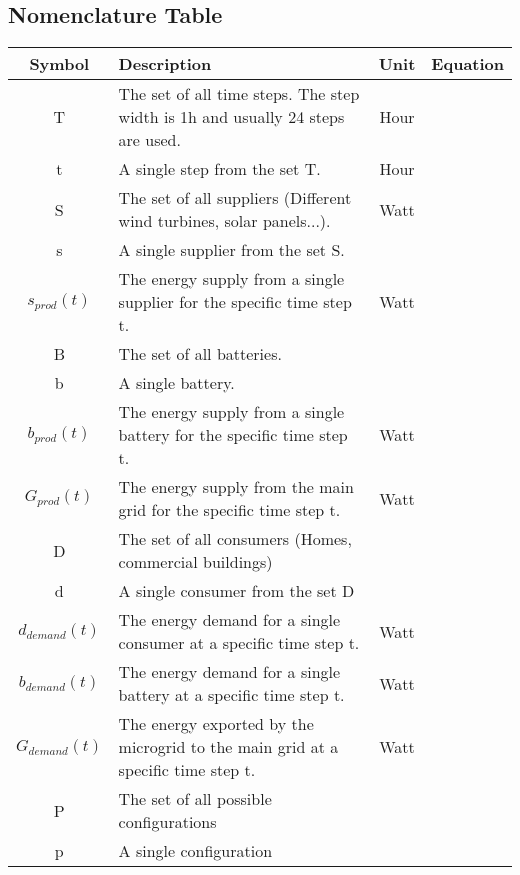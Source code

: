 \subsection{Nomenclature Table}
	\begin{longtable}{|c|p{10cm}|c|c|}
		\toprule
		\textbf{Symbol} & \textbf{Description} & \textbf{Unit} & \textbf{Equation} \\ \midrule
		T & The set of all time steps. The step width is 1h and usually 24 steps are used. & Hour & \Cref{eq1:balance,eq:opt} \\ \midrule
		t & A single step from the set T. & Hour & \Cref{eq1:balance,eq:opt} \\ \midrule
		S & The set of all suppliers (Different wind turbines, solar panels...). & Watt & \Cref{eq1:balance} \\ \midrule
		s & A single supplier from the set S. & & \Cref{eq1:balance} \\ \midrule
		$s_{prod}(t)$ & The energy supply from a single supplier for the specific time step t. & Watt & \Cref{eq1:balance} \\ \midrule
		B & The set of all batteries. & & \Cref{eq1:balance} \\ \midrule
		b & A single battery. & & \Cref{eq1:balance} \\ \midrule
		$b_{prod}(t)$ & The energy supply from a single battery for the specific time step t. & Watt & \Cref{eq1:balance} \\ \midrule
		$G_{prod}(t)$ & The energy supply from the main grid for the specific time step t. & Watt & \Cref{eq1:balance} \\ \midrule
		D & The set of all consumers (Homes, commercial buildings) & & \Cref{eq1:balance} \\ \midrule
		d & A single consumer from the set D & & \Cref{eq1:balance} \\ \midrule
		$d_{demand}(t)$ & The energy demand for a single consumer at a specific time step t. & Watt & \Cref{eq1:balance} \\ \midrule
		$b_{demand}(t)$ & The energy demand for a single battery at a specific time step t. & Watt & \Cref{eq1:balance} \\ \midrule
		$G_{demand}(t)$ & The energy exported by the microgrid to the main grid at a specific time step t. & Watt & \Cref{eq1:balance} \\
		P & The set of all possible configurations &  & \Cref{eq:opt} \\ \midrule
		p & A single configuration &  & \Cref{eq:opt} \\ \midrule

\end{longtable}
